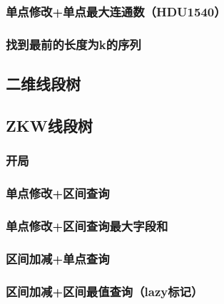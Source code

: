 \documentclass[landscape,twocolumn,twoside,a4paper]{article}
\begin{document}
\subsubsection{单点修改+单点最大连通数（HDU1540）}


\subsubsection{找到最前的长度为k的序列}


\subsection{二维线段树}



\subsection{ZKW线段树}

\subsubsection{开局}


\subsubsection{单点修改+区间查询}


\subsubsection{单点修改+区间查询最大字段和}


\subsubsection{区间加减+单点查询}


\subsubsection{区间加减+区间最值查询（lazy标记）}

\end{document}
